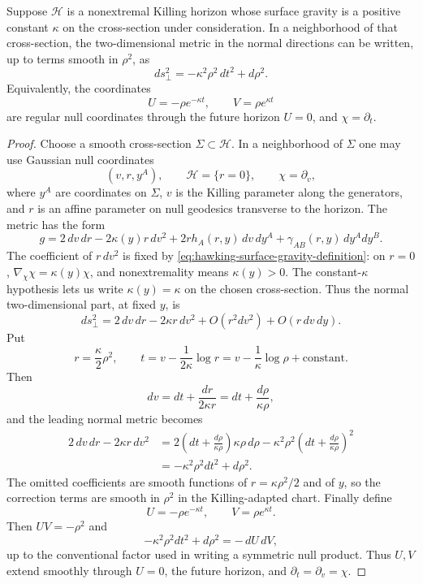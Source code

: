 \begin{lemma}
\label{lem:hawking-rindler-normal-form}
Suppose \(\mathcal H\) is a nonextremal Killing horizon whose surface gravity
is a positive constant \(\kappa\) on the cross-section under consideration.
In a neighborhood of that cross-section, the two-dimensional metric in the
normal directions can be written, up to terms smooth in \(\rho^2\), as
\[
  ds^2_{\perp}
  =
  -\kappa^2\rho^2\,dt^2+d\rho^2 .
\]
Equivalently, the coordinates
\[
  U=-\rho e^{-\kappa t},\qquad V=\rho e^{\kappa t}
\]
are regular null coordinates through the future horizon \(U=0\), and
\(\chi=\partial_t\).
\end{lemma}

\begin{proof}
Choose a smooth cross-section \(\Sigma\subset\mathcal H\).  In a neighborhood
of \(\Sigma\) one may use Gaussian null coordinates
\[
  (v,r,y^A),
  \qquad
  \mathcal H=\{r=0\},
  \qquad
  \chi=\partial_v ,
\]
where \(y^A\) are coordinates on \(\Sigma\), \(v\) is the Killing parameter
along the generators, and \(r\) is an affine parameter on null geodesics
transverse to the horizon.  The metric has the form
\[
  g
  =
  2\,dv\,dr
  -2\kappa(y) r\,dv^2
  +2r h_A(r,y)\,dv\,dy^A
  +\gamma_{AB}(r,y)\,dy^A dy^B .
\]
The coefficient of \(r\,dv^2\) is fixed by
\eqref{eq:hawking-surface-gravity-definition}: on \(r=0\),
\(\nabla_\chi\chi=\kappa(y)\chi\), and nonextremality means
\(\kappa(y)>0\).  The constant-\(\kappa\) hypothesis lets us write
\(\kappa(y)=\kappa\) on the chosen cross-section.
Thus the normal two-dimensional part, at fixed \(y\), is
\[
  ds_\perp^2=2\,dv\,dr-2\kappa r\,dv^2+O(r^2dv^2)+O(r\,dv\,dy).
\]
Put
\[
  r=\frac{\kappa}{2}\rho^2,
  \qquad
  t=v-\frac{1}{2\kappa}\log r
  =
  v-\frac1\kappa\log\rho+\text{constant}.
\]
Then
\[
  dv=dt+\frac{dr}{2\kappa r}
  =
  dt+\frac{d\rho}{\kappa\rho},
\]
and the leading normal metric becomes
\[
\begin{aligned}
  2\,dv\,dr-2\kappa r\,dv^2
  &=
  2\left(dt+\frac{d\rho}{\kappa\rho}\right)\kappa\rho\,d\rho
  -\kappa^2\rho^2
   \left(dt+\frac{d\rho}{\kappa\rho}\right)^2  \\
  &=
  -\kappa^2\rho^2dt^2+d\rho^2 .
\end{aligned}
\]
The omitted coefficients are smooth functions of \(r=\kappa\rho^2/2\) and of
\(y\), so the correction terms are smooth in \(\rho^2\) in the
Killing-adapted chart.  Finally define
\[
  U=-\rho e^{-\kappa t},
  \qquad
  V=\rho e^{\kappa t}.
\]
Then \(UV=-\rho^2\) and
\[
  -\kappa^2\rho^2dt^2+d\rho^2=-\,dU\,dV ,
\]
up to the conventional factor used in writing a symmetric null product.
Thus \(U,V\) extend smoothly through \(U=0\), the future horizon, and
\(\partial_t=\partial_v=\chi\).
\end{proof}


